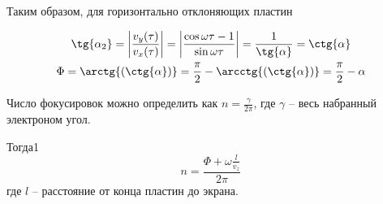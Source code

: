 Таким образом, для горизонтально отклоняющих пластин 

\begin{gather}
	\tg{\alpha_2}=\left|\frac{v_y(\tau)}{v_x(\tau)}\right|=\left|\frac{\cos\omega{\tau}-1}{\sin{\omega{\tau}}}\right|=\frac{1}{\tg{\alpha}}=\ctg{\alpha}\\
	\Phi=\arctg{(\ctg{\alpha})}=\frac{\pi}{2}-\arcctg{(\ctg{\alpha})}=\frac{\pi}{2}-\alpha
\end{gather}

Число фокусировок можно определить как $n=\frac{\gamma}{2\pi}$, где $\gamma$ -- весь набранный электроном угол.

Тогда1
\begin{equation}
	n=\frac{\Phi+\omega\frac{l}{v_z}}{2\pi}
\end{equation}
где $l$ -- расстояние от конца пластин до экрана.


